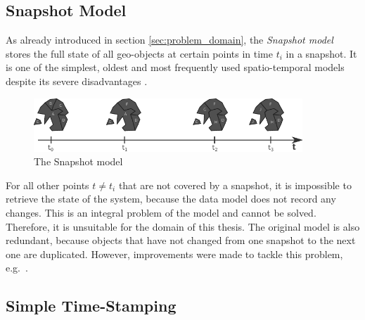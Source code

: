 
\subsection{Snapshot Model} %
\label{sub:snapshot_model}

As already introduced in section \ref{sec:problem_domain}, the \emph{Snapshot model} stores the full state of all geo-objects at certain points in time $t_i$ in a snapshot. It is one of the simplest, oldest and most frequently used spatio-temporal models despite its severe disadvantages
\cite{Langran1988frameworktgis}.

\begin{figure}[ht]
  \vspace{1em}
  \centering
  \includegraphics[width=0.9\textwidth]{graphics/basics/stdm/snapshot_model}
  \caption{The Snapshot model \cite{Langran1988frameworktgis}}
  \label{fig:snapshot_model}
\end{figure}

For all other points $t \neq t_i$ that are not covered by a snapshot, it is impossible to retrieve the state of the system, because the data model does not record any changes. This is an integral problem of the model and cannot be solved. Therefore, it is unsuitable for the domain of this thesis. The original model is also redundant, because objects that have not changed from one snapshot to the next one are duplicated. However, improvements were made to tackle this problem, e.g.\ \cite{armenakis92}.


\subsection{Simple Time-Stamping} %
\label{sub:simple_time_stamping}

